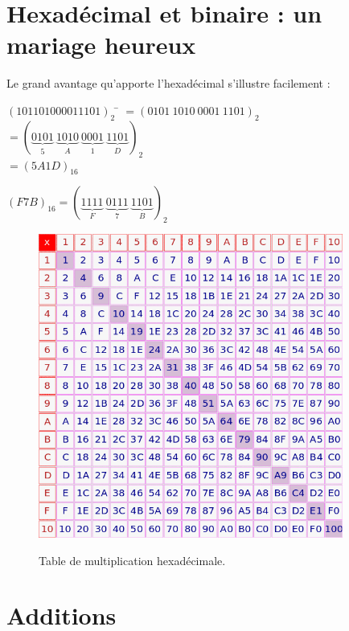 \section{Hexadécimal et binaire : un mariage heureux}
Le grand avantage qu'apporte l'hexadécimal s'illustre facilement :

\begin{methode}
    \begin{tabbing}
        $(101101000011101)_2$	\=	$=(0101\ 1010\ 0001\ 1101)_2$\\
        \>	$=\left(\underbrace{0101}_5\ \underbrace{1010}_A\ \underbrace{0001}_1\ \underbrace{1101}_D\right)_2$\\
        \>	$=(5A1D)_{16}$
    \end{tabbing}
\end{methode}

\begin{methode}
    $(F7B)_{16}=\left(\underbrace{1111}_F\ \underbrace{0111}_7\ \underbrace{1101}_B\right)_2$
\end{methode}
\begin{figure}
    \begin{center}
        \includegraphics[width=10cm]{img/hexmult.png}\\
        \caption*{Table de multiplication hexadécimale.}
    \end{center}
\end{figure}


\section{Additions}

